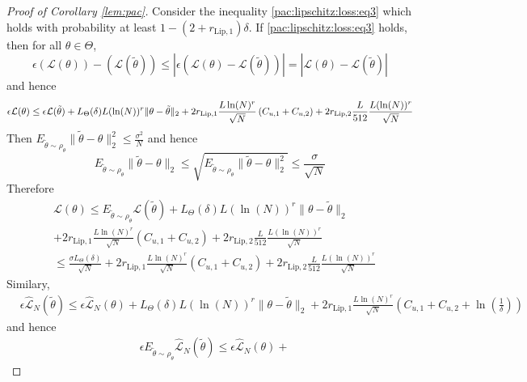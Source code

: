\documentclass{article}
\begin{document}
\begin{proof}[Proof of Corollary \ref{lem:pac}]
 Consider the inequality \eqref{pac:lipschitz:loss:eq3} which holds with probability at least $1-(2+r_{\mathrm{Lip,1}})\delta$.
If \eqref{pac:lipschitz:loss:eq3} holds, then for all $\theta \in \Theta$,
\[ \epsilon (\mathcal{L}(\theta)) - (\mathcal{L}(\tilde{\theta}))  \le |\epsilon (\mathcal{L}(\theta)-\mathcal{L}(\tilde{\theta}))|=|\mathcal{L}(\theta)-\mathcal{L}(\tilde{\theta})| \]
and hence 
\[
   \epsilon \mathcal{L}(\theta) \le \epsilon \mathcal{L}(\tilde{\theta}) 
      + L_{\Theta}(\delta) L(\ln(N))^r \|\theta - \tilde{\theta}\|_2
          + 2r_{\text{Lip},1}\frac{L\ln(N)^{r}}{\sqrt{N}}\left(C_{u,1} + C_{u,2}\right) + \\
            2r_{\text{Lip},2}  \frac{L}{512} \frac{L(\ln(N))^r}{\sqrt{N}}
\]
Then $E_{\tilde{\theta} \sim \rho_{\theta}} \|\tilde{\theta}-\theta\|^2_2 \le \frac{\sigma^2}{N}$ and hence
 \[ E_{\tilde{\theta} \sim \rho_{\theta}} \|\tilde{\theta}-\theta\|_2 \le  \sqrt{E_{\tilde{\theta} \sim \rho_{\theta}} \|\tilde{\theta}-\theta\|^2_2} \le \frac{\sigma}{\sqrt{N}} \]
Therefore
\begin{equation}
  \label{lem:pac:eq1}
\begin{aligned}
    & \mathcal{L}(\theta) \le E_{\tilde{\theta} \sim \rho_{\theta}}\mathcal{L}(\tilde{\theta}) + 
     L_{\Theta}(\delta) L(\ln(N))^r   \|\theta - \tilde{\theta}\|_2 \\
          & + 2r_{\text{Lip},1}\frac{L\ln(N)^{r}}{\sqrt{N}}\left(C_{u,1} + C_{u,2}\right) + 
          2r_{\text{Lip},2}  \frac{L}{512} \frac{L(\ln(N))^r}{\sqrt{N}} \\
          & \le \frac{\sigma L_{\Theta}(\delta)}{\sqrt{N}}+2r_{\text{Lip},1}\frac{L\ln(N)^{r}}{\sqrt{N}}\left(C_{u,1} + C_{u,2}\right) + 
          2r_{\text{Lip},2}  \frac{L}{512} \frac{L(\ln(N))^r}{\sqrt{N}}
\end{aligned}
\end{equation}
Similary, 
\begin{align*}
& \epsilon \hat{\mathcal{L}}_N(\tilde{\theta}) \le \epsilon \hat{\mathcal{L}}_N(\theta) + 
L_{\Theta}(\delta) L(\ln(N))^r \|\theta - \tilde{\theta}\|_2
           +  2r_{\text{Lip},1}\frac{L\ln(N)^{r}}{\sqrt{N}}\left(C_{u,1} + C_{u,2}+\ln\left(\frac{1}{\delta}\right)\right)
\end{align*}
and hence 
\begin{equation}
  \label{lem:pac:eq2}
\begin{aligned}
    & \epsilon E_{\tilde{\theta} \sim \rho_{\theta}}\hat{\mathcal{L}}_N(\tilde{\theta})  \le  \epsilon \hat{\mathcal{L}}_N(\theta)+

\end{aligned}
\end{equation}
\end{proof}
\end{document}

